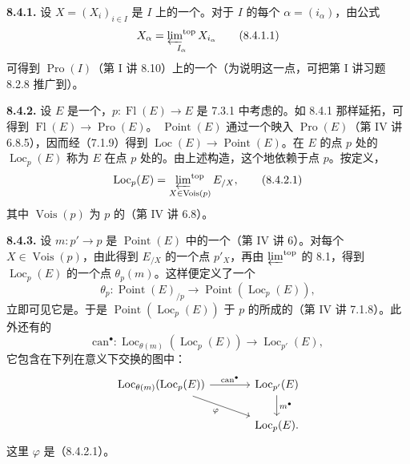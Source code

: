 \textbf{8.4.1.} 设 $X=(X_i)_{i\in I}$ 是 $I$ 上的一个。对于 $I$ 的每个 $\alpha=(i_\alpha)$，由公式
\[
 X_\alpha=\mathop{\varprojlim\nolimits^{\mathrm{top}}}_{I_\alpha}X_{i_\alpha}
 \tag{8.4.1.1}
\]
可得到 $\operatorname{Pro}(I)$（第 I 讲 8.10）上的一个（为说明这一点，可把第 I 讲习题 8.2.8 推广到）。

\textbf{8.4.2.} 设 $E$ 是一个，$p:\operatorname{Fl}(E)\to E$ 是 7.3.1 中考虑的。如 8.4.1 那样延拓，可得到 $\operatorname{Fl}(E)\to\operatorname{Pro}(E)$。 $\operatorname{Point}(E)$ 通过一个映入 $\operatorname{Pro}(E)$（第 IV 讲 6.8.5），因而经（7.1.9）得到 $\operatorname{Loc}(E)\to\operatorname{Point}(E)$。在 $E$ 的点 $p$ 处的 $\operatorname{Loc}_p(E)$ 称为 $E$ 在点 $p$ 处的。由上述构造，这个地依赖于点 $p$。按定义，
\[
 \operatorname{Loc}_p(E)=\mathop{\varprojlim\nolimits^{\mathrm{top}}}_{X\in\operatorname{Vois}(p)}E_{/X},
 \tag{8.4.2.1}
\]
其中 $\operatorname{Vois}(p)$ 为 $p$ 的（第 IV 讲 6.8）。

\textbf{8.4.3.} 设 $m:p'\to p$ 是 $\operatorname{Point}(E)$ 中的一个（第 IV 讲 6）。对每个 $X\in\operatorname{Vois}(p)$，由此得到 $E_{/X}$ 的一个点 $p'_X$，再由 $\varprojlim^{\mathrm{top}}$ 的 8.1，得到 $\operatorname{Loc}_p(E)$ 的一个点 $\theta_p(m)$。这样便定义了一个
\[
 \theta_p:\operatorname{Point}(E)_{/p}\longrightarrow
 \operatorname{Point}(\operatorname{Loc}_p(E)),\tag{8.4.3.1}
\]
立即可见它是。于是 $\operatorname{Point}(\operatorname{Loc}_p(E))$ 于 $p$ 的所成的（第 IV 讲 7.1.8）。此外还有的
\[
 \mathrm{can}^{\bullet}:\operatorname{Loc}_{\theta(m)}(\operatorname{Loc}_p(E))
 \longrightarrow\operatorname{Loc}_{p'}(E),
\]
它包含在下列在意义下交换的图中：
\[
\begin{tikzcd}[column sep=large]
\operatorname{Loc}_{\theta(m)}(\operatorname{Loc}_p(E))
 \arrow[r,"\mathrm{can}^{\bullet}"]\arrow[dr,"\varphi"']
 &\operatorname{Loc}_{p'}(E)\arrow[d,"m^{\bullet}"]\\
 &\operatorname{Loc}_p(E).
\end{tikzcd}
\]
这里 $\varphi$ 是（8.4.2.1）。

